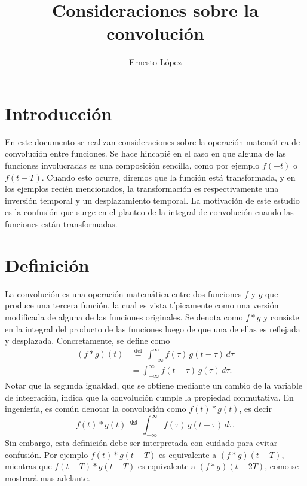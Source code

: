 \documentclass[a4paper]{article}
\title{Consideraciones sobre la convolución}
\author{Ernesto López}
\begin{document}
 

\maketitle

\section{Introducción}

En este documento se realizan consideraciones sobre la operación matemática de convolución entre funciones. Se hace hincapié en el caso en que alguna de las funciones involucradas es una composición sencilla, como por ejemplo \(f(-t)\) o \(f(t-T)\). Cuando esto ocurre, diremos que la función está transformada, y en los ejemplos recién mencionados, la transformación es respectivamente una inversión temporal y un desplazamiento temporal. La motivación de este estudio es la confusión que surge en el planteo de la integral de convolución cuando las funciones están transformadas.

\section{Definición}\label{sec:definition}

La convolución es una operación matemática entre dos funciones \(f\) y \(g\) que produce una tercera función, la cual es vista típicamente como una versión modificada de alguna de las funciones originales. 
Se denota como \(f*g\) y consiste en la integral del producto de las funciones luego de que una de ellas es reflejada y desplazada. Concretamente, se define como
\begin{equation}\label{eq:convolution_definition}
\begin{aligned}
 (f*g)(t)&\,{\stackrel {\mathrm {def} }{=}}\ \int _{-\infty }^{\infty }f(\tau )\,g(t-\tau )\,d\tau \\
         &=\int _{-\infty }^{\infty }f(t-\tau )\,g(\tau )\,d\tau. 
\end{aligned}
\end{equation}
Notar que la segunda igualdad, que se obtiene mediante un cambio de la variable de integración, indica que la convolución cumple la propiedad conmutativa.
En ingeniería, es común denotar la convolución como \(f(t)*g(t)\), es decir
\[
 f(t)*g(t)\,{\stackrel {\mathrm {def} }{=}}\ \int _{-\infty }^{\infty }f(\tau )\,g(t-\tau )\,d\tau.
\]
Sin embargo, esta definición debe ser interpretada con cuidado para evitar confusión. Por ejemplo \(f(t)*g(t-T)\) es equivalente a \((f*g)(t-T)\), mientras que \(f(t-T)*g(t-T)\) es equivalente a \((f*g)(t-2T)\), como se mostrará mas adelante.
\end{document}
